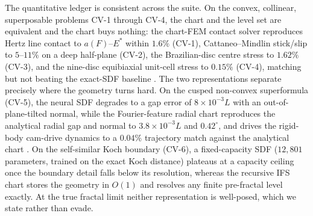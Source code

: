 The quantitative ledger is consistent across the suite. On the convex, collinear, superposable
problems CV-1 through CV-4, the chart and the level set are equivalent and the chart buys
nothing: the chart-FEM contact solver reproduces Hertz line contact to $a(F)$--$E^*$ within
$1.6\%$ (CV-1), Cattaneo--Mindlin stick/slip to $5$--$11\%$ on a deep half-plane (CV-2), the
Brazilian-disc centre stress to $1.62\%$ (CV-3), and the nine-disc equibiaxial unit-cell stress
to $0.15\%$ (CV-4), matching but not beating the exact-SDF baseline
\citep{johnson1985contact,hondros1959evaluation,timoshenko1970elasticity,mindlin1949compliance}.
The two representations separate precisely where the geometry turns hard. On the cusped
non-convex superformula (CV-5), the neural SDF degrades to a gap error of $8\times10^{-3}L$ with an
out-of-plane-tilted normal, while the Fourier-feature radial chart reproduces the analytical
radial gap and normal to $3.8\times10^{-3}L$ and $0.42^\circ$, and drives the rigid-body
cam-drive dynamics to a $0.04\%$ trajectory match against the analytical chart
\citep{gielis2003generic}. On the self-similar Koch boundary (CV-6), a fixed-capacity SDF
($12{,}801$ parameters, trained on the exact Koch distance) plateaus at a capacity ceiling once
the boundary detail falls below its resolution, whereas the recursive IFS chart stores the
geometry in $O(1)$ and resolves any finite pre-fractal level exactly. At the true fractal limit
neither representation is well-posed, which we state rather than evade.


